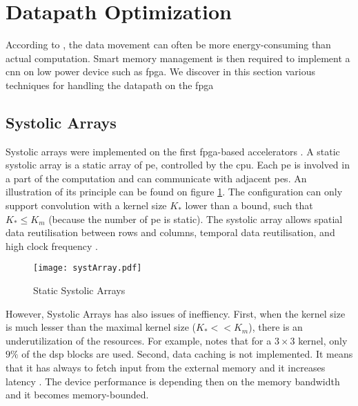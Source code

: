 \section{Datapath Optimization} \label{sec:dtptopti}
According to \cite{chen_eyeriss_2017}, the data movement can often be more energy-consuming than actual computation. Smart memory management is then required to implement a \acrshort{cnn} on low power device such as \acrshort{fpga}. We discover in this section various techniques for handling the datapath on the \acrshort{fpga}
%
%
\subsection{Systolic Arrays}
%
%
Systolic arrays were implemented on the first \acrshort{fpga}-based accelerators \cite{farabet_cnp_2009, gokhale_240_2014}. A static systolic array is a static array of \acrshort{pe}, controlled by the \acrshort{cpu}. Each \acrshort{pe} is involved in a part of the computation and can communicate with adjacent \acrshort{pe}s. An illustration of its principle can be found on figure \ref{fig:sytar}. The configuration can only support convolution with a kernel size $K_*$ lower than a bound, such that $K_* \leq K_m$ (because the number of \acrshort{pe} is static). The systolic array allows spatial data reutilisation between rows and columns, temporal data reutilisation, and high clock frequency \cite{joos_de_ter_beerst_accelerating_2019, mittal_survey_2020}.
\begin{figure}
    \centering
    \texttt{[image: systArray.pdf]}
    \caption{Static Systolic Arrays}
    \label{fig:sytar}
\end{figure} \newline \newline
However, Systolic Arrays has also issues of ineffiency. First, when the kernel size is much lesser than the maximal kernel size ($K_* << K_m$), there is an underutilization of the resources. For example, \cite{gokhale_240_2014} notes that for a $3 \times 3$ kernel, only $9\%$ of the \acrfull{dsp} blocks are used. Second, data caching is not implemented. It means that it has always to fetch input from the external memory and it increases latency \cite{wei_automated_2017, abdelouahab_accelerating_2018}. The device performance is depending then on the memory bandwidth and it becomes memory-bounded.
%
%
